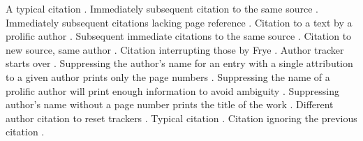 \documentclass{article}
\begin{document}
A typical citation \autocite[12]{morrison02aa}. Immediately subsequent citation to the same source \autocite[34]{morrison02aa}. Immediately subsequent citations lacking page reference \autocite{morrison02aa}. Citation to a text by a prolific author \autocite[12]{frye57ab}. Subsequent immediate citations to the same source \autocite[34]{frye57ab}. Citation to new source, same author \autocite[56]{frye91aa}. Citation interrupting those by Frye \autocite[101]{morrison02aa}. Author tracker starts over \autocite[78]{frye91aa}. Suppressing the author's name for an entry with a single attribution to a given author prints only the page numbers \autocite*[102]{morrison02aa}. Suppressing the name of a prolific author will print enough information to avoid ambiguity \autocite*[91]{frye57ab}. Suppressing author's name without a page number prints the title of the work \autocite*{morrison02aa}. Different author citation to reset trackers \autocite[91]{frye91aa}. Typical citation \autocite[12]{morrison02aa}. Citation ignoring the previous citation \mancite\autocite[34]{morrison02aa}.

\nocite{*}



\printbibliography
\end{document}
